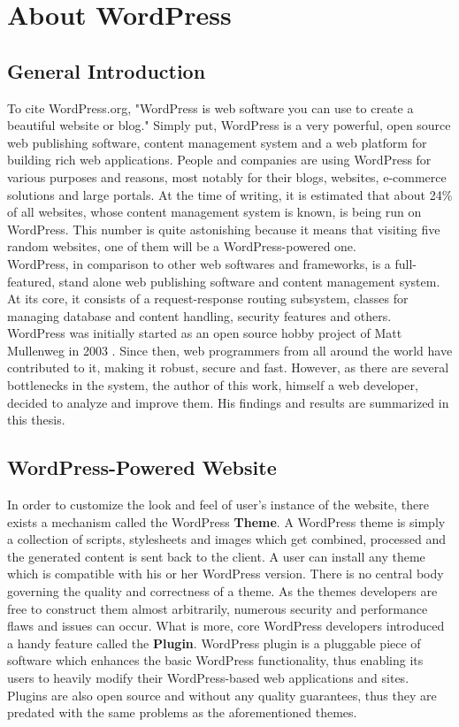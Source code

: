 \section{About WordPress}

\subsection{General Introduction}

To cite WordPress.org, "WordPress is web software you can use to create a beautiful website or blog."\cite{WP:WP.org} Simply put, WordPress is a very powerful, open source web publishing software, content management system and a web platform for building rich web applications. People and companies are using WordPress for various purposes and reasons, most notably for their blogs, websites, e-commerce solutions and large portals. At the time of writing, it is estimated that about 24\% \cite{W3Techs:WP-usage} of all websites, whose content management system is known, is being run on WordPress. This number is quite astonishing because it means that visiting five random websites, one of them will be a WordPress-powered one. \\

WordPress, in comparison to other web softwares and frameworks, is a full-featured, stand alone web publishing software and content management system. At its core, it consists of a request-response routing subsystem, classes for managing database and content handling, security features and others. WordPress was initially started as an open source hobby project of Matt Mullenweg in 2003 \cite{WP:History}. Since then, web programmers from all around the world have contributed to it, making it robust, secure and fast. However, as there are several bottlenecks in the system, the author of this work, himself a web developer, decided to analyze and improve them. His findings and results are summarized in this thesis.

\subsection{WordPress-Powered Website}

In order to customize the look and feel of user’s instance of the website, there exists a mechanism called the WordPress \textbf{Theme}. A WordPress theme is simply a collection of scripts, stylesheets and images which get combined, processed and the generated content is sent back to the client. A user can install any theme which is compatible with his or her WordPress version. There is no central body governing the quality and correctness of a theme. As the themes developers are free to construct them almost arbitrarily, numerous security and performance flaws and issues can occur. What is more, core WordPress developers introduced a handy feature called the \textbf{Plugin}. WordPress plugin is a pluggable piece of software which enhances the basic WordPress functionality, thus enabling its users to heavily modify their WordPress-based web applications and sites. Plugins are also open source and without any quality guarantees, thus they are predated with the same problems as the aforementioned themes. \\

